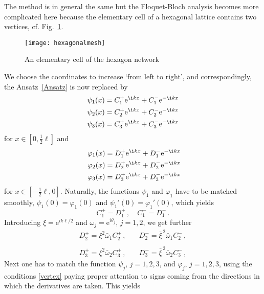 \documentclass[english]{elsarticle}
\newcommand{\e}{\mathrm{e}}
\begin{document}
The method is in general the same but the Floquet-Bloch analysis becomes more complicated here because the elementary cell of a hexagonal lattice contains two vertices, cf. Fig.~\ref{elemcell}.
\begin{figure}[htbp]
     \centering
     \texttt{[image: hexagonalmesh]}
     \caption{An elementary cell of the hexagon network}\label{elemcell}
\end{figure}
We choose the coordinates to increase `from left to right', and correspondingly, the Ansatz~\eqref{Ansatz} is now replaced by
\begin{align}
\psi_1(x)&=C_1^+\e^{\i k x}+C_1^-\e^{-\i k x} \nonumber \\
\psi_2(x)&=C_2^+\e^{\i k x}+C_2^-\e^{-\i k x} \label{psi} \\
\psi_3(x)&=C_3^+\e^{\i k x}+C_3^-\e^{-\i k x} \nonumber
\end{align}
for $x\in[0,\frac12\ell]$ and
\begin{align}
\varphi_1(x)&=D_1^+\e^{\i k x}+D_1^-\e^{-\i k x} \nonumber \\\
\varphi_2(x)&=D_2^+\e^{\i k x}+D_2^-\e^{-\i k x} \label{phi} \\
\varphi_3(x)&=D_3^+\e^{\i k x}+D_3^-\e^{-\i k x} \nonumber
\end{align}
for $x\in[-\frac12\ell,0]$. Naturally, the functions $\psi_1$ and $\varphi_1$ have to be matched smoothly, $\psi_1(0)=\varphi_1(0)$ and $\psi_1'(0)=\varphi_1'(0)$, which yields
\begin{equation}\label{CD1}
C_1^+=D_1^+\,,\quad C_1^-=D_1^-\,.
\end{equation}
Introducing $\xi =\e^{ik\ell/2}$ and $\omega_j = \e^{i\theta_j},\, j=1,2$, we get further
\begin{align}
D_2^+ =\xi^2\bar\omega_1 C_2^+\,,& \quad D_2^- =\bar\xi^{\,2}\bar\omega_1 C_2^-\,, \nonumber \\[-.6em] \label{CD23} \\[-.6em]
D_3^+ =\xi^2\bar\omega_2 C_3^+\,,& \quad D_3^- =\bar\xi^{\,2}\bar\omega_2 C_3^-\,, \nonumber
\end{align}
Next one has to match the function $\psi_j,\, j=1,2,3$, and $\varphi_j,\, j=1,2,3$, using the conditions \eqref{vertex} paying proper attention to signs coming from the directions in which the derivatives are taken. This yields
\end{document}
